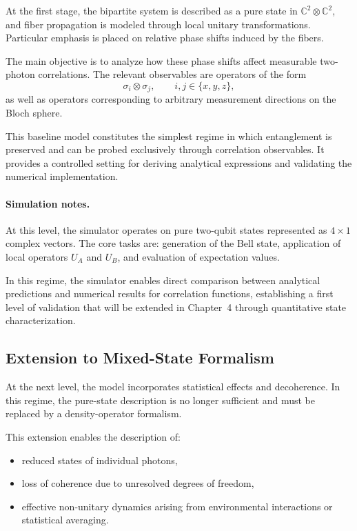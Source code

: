 \documentclass[a4paper]{article}
\begin{document}
At the first stage, the bipartite system is described as a pure state in \(\mathbb{C}^2 \otimes \mathbb{C}^2\), and fiber propagation is modeled through local unitary transformations. Particular emphasis is placed on relative phase shifts induced by the fibers.

The main objective is to analyze how these phase shifts affect measurable two-photon correlations. The relevant observables are operators of the form
\[
\sigma_i \otimes \sigma_j,
\qquad i,j \in \{x,y,z\},
\]
as well as operators corresponding to arbitrary measurement directions on the Bloch sphere.

This baseline model constitutes the simplest regime in which entanglement is preserved and can be probed exclusively through correlation observables. It provides a controlled setting for deriving analytical expressions and validating the numerical implementation.

\paragraph{Simulation notes.}
At this level, the simulator operates on pure two-qubit states represented as \(4 \times 1\) complex vectors. The core tasks are: generation of the Bell state, application of local operators \(U_A\) and \(U_B\), and evaluation of expectation values.

In this regime, the simulator enables direct comparison between analytical predictions and numerical results for correlation functions, establishing a first level of validation that will be extended in Chapter~4 through quantitative state characterization.

\subsection{Extension to Mixed-State Formalism}

At the next level, the model incorporates statistical effects and decoherence. In this regime, the pure-state description is no longer sufficient and must be replaced by a density-operator formalism.

This extension enables the description of:
\begin{itemize}
    \item reduced states of individual photons,
    \item loss of coherence due to unresolved degrees of freedom,
    \item effective non-unitary dynamics arising from environmental interactions or statistical averaging.
\end{itemize}
\end{document}

